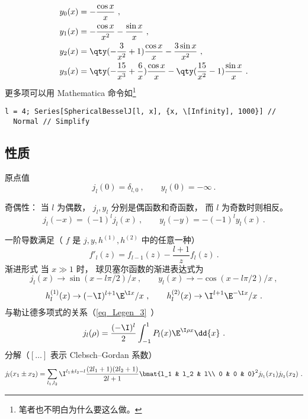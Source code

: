 \begin{align}
&y_0(x) = -\frac{\cos x}{x}~,\\
&y_1(x) = -\frac{\cos x}{x^2} - \frac{\sin x}{x}~,\\
&y_2(x) = \qty(-\frac{3}{x^2}+1)\frac{\cos x}{x} - \frac{3\sin x}{x^2}~,\\
&y_3(x) = \qty(-\frac{15}{x^3}+\frac{6}{x}) \frac{\cos x}{x} - \qty(\frac{15}{x^2} - 1)\frac{\sin x}{x}~.
\end{align}
更多项可以用 Mathematica 命令如\footnote{笔者也不明白为什么要这么做。}
\begin{lstlisting}[language=mma]
l = 4; Series[SphericalBesselJ[l, x], {x, \[Infinity], 1000}] // 
  Normal // Simplify
\end{lstlisting}

\subsection{性质}
原点值
\begin{equation}
j_l(0) = \delta_{l,0} ~,\qquad y_l(0) = -\infty~.
\end{equation}

奇偶性： 当 $l$ 为偶数， $j_l, y_l$ 分别是偶函数和奇函数， 而 $l$ 为奇数时则相反。
\begin{equation}\label{eq_SphBsl_3}
j_l(-x) = (-1)^l j_l(x)~,
\qquad
y_l(-y) = -(-1)^l y_l(x)~.
\end{equation}

一阶导数满足（ $f$ 是 $j, y, h^{(1)}, h^{(2)}$ 中的任意一种）
\begin{equation}
f'_l(z) = f_{l-1}(z) - \frac{l+1}{z} f_l(z)~.
\end{equation}
渐进形式
当 $x \gg 1$ 时， 球贝塞尔函数的渐进表达式为
\begin{equation}\label{eq_SphBsl_2}
j_l(x) \to \sin(x - l\pi /2)/x~,
\qquad
y_l(x) \to  - \cos(x - l\pi /2)/x~,
\end{equation}
\begin{equation}
h_l^{(1)}(x) \to ( -\I)^{l+1} \E^{\I x}/x~,
\qquad
h_l^{(2)}(x) \to \I^{l + 1} \E^{-\I x}/x~.
\end{equation}
与勒让德多项式的关系（\autoref{eq_Legen_3}~）
\begin{equation}
j_l(\rho) = \frac{(-\I)^l}{2} \int_{-1}^1 P_l(x) \E^{\I \rho x} \dd{x}~.
\end{equation}
分解（$[\dots]$ 表示 Clebsch–Gordan 系数）
\begin{equation}
j_l(x_1 \pm x_2) = \sum_{l_1,l_2} \I^{l_1\pm l_2-l} \frac{(2l_1+1)(2l_2+1)}{2l+1}
\bmat{l_1 & l_2 & l\\ 0 & 0 & 0}^2 j_{l_1}(x_1) j_{l_2}(x_2)~.
\end{equation}

